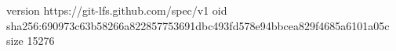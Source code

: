 version https://git-lfs.github.com/spec/v1
oid sha256:690973c63b58266a822857753691dbc493fd578e94bbcea829f4685a6101a05c
size 15276
